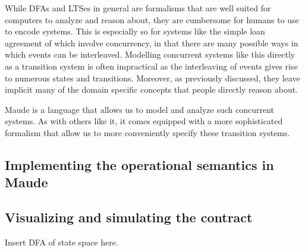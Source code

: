 \documentclass{article}
\begin{document}
While DFAs and LTSes in general are formalisms that are well suited for
computers to analyze and reason about, they are cumbersome for humans to use
to encode systems.
This is especially so for systems like the simple loan agreement of
\cite{contract_as_automaton} which involve concurrency, in that there are
many possible ways in which events can be interleaved.
Modelling concurrent systems like this directly as a transition system is
often impractical as the interleaving of events gives rise to numerous states
and transitions.
Moreover, as previously discussed, they leave implicit many of the domain
specific concepts that people directly reason about.

Maude is a language that allows us to model and analyze such concurrent systems.
As with others like it, it comes equipped with a more sophisticated formalism
that allow us to more conveniently specify these transition systems.



\subsection{Implementing the operational semantics in Maude}

\subsection{Visualizing and simulating the contract}
Insert DFA of state space here.


\end{document}

